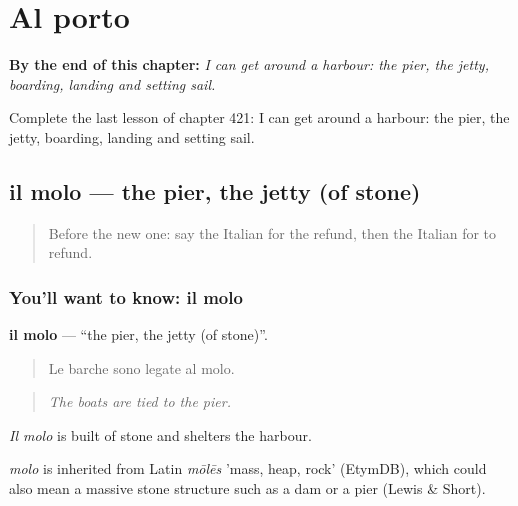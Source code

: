 
\chapter{Al porto}
\label{ch:it-al-porto}

\begin{chapteropening}
\textbf{By the end of this chapter:} \emph{I can get around a harbour: the pier, the jetty, boarding, landing and setting sail.}

Complete the last lesson of chapter 421: I can get around a harbour: the pier, the jetty, boarding, landing and setting sail.
\end{chapteropening}

\section[il molo]{il molo — the pier, the jetty (of stone)}

\label{lesson:IT-C421-molo}



\begin{quote}
Before the new one: say the Italian for the refund, then the Italian for to refund.
\end{quote}

\subsection*{You'll want to know: il molo}
\textbf{il molo} — \textquotedblleft{}the pier, the jetty (of stone)\textquotedblright{}.

\begin{quote}
Le barche sono legate al molo.
\end{quote}

\begin{quote}
\emph{The boats are tied to the pier.}
\end{quote}

\emph{Il molo} is built of stone and shelters the harbour.

\begin{cousinweb}
\emph{molo} is inherited from Latin \emph{mōlēs} 'mass, heap, rock' (EtymDB), which could also mean a massive stone structure such as a dam or a pier (Lewis \& Short).
\end{cousinweb}

